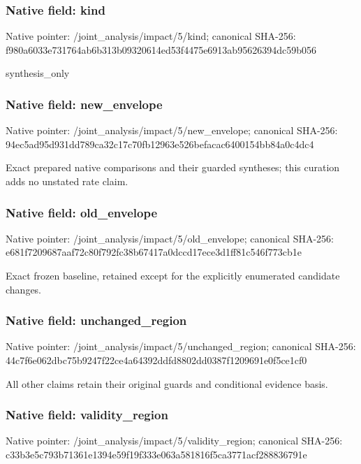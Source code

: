 \documentclass[10pt,a4paper]{article}
\begin{document}
\subsubsection{Native field: kind}
Native pointer: /joint\_\allowbreak{}analysis/impact/5/kind; canonical SHA-256: f980a6033e731764ab6b313b09320614ed53f4475e6913ab95626394dc59b056

\begingroup\raggedright\sloppy synthesis\_\allowbreak{}only\par\endgroup

\subsubsection{Native field: new\_\allowbreak{}envelope}
Native pointer: /joint\_\allowbreak{}analysis/impact/5/new\_\allowbreak{}envelope; canonical SHA-256: 94ec5ad95d931dd789ca32c17c70fb12963e526befacac6400154bb84a0c4dc4

\begingroup\raggedright\sloppy Exact prepared native comparisons and their guarded syntheses;\allowbreak{} this curation adds no unstated rate claim.\par\endgroup

\subsubsection{Native field: old\_\allowbreak{}envelope}
Native pointer: /joint\_\allowbreak{}analysis/impact/5/old\_\allowbreak{}envelope; canonical SHA-256: e681f7209687aaf72c80f792fc38b67417a0dccd17ece3d1ff81c546f773cb1e

\begingroup\raggedright\sloppy Exact frozen baseline,\allowbreak{} retained except for the explicitly enumerated candidate changes.\par\endgroup

\subsubsection{Native field: unchanged\_\allowbreak{}region}
Native pointer: /joint\_\allowbreak{}analysis/impact/5/unchanged\_\allowbreak{}region; canonical SHA-256: 44c7f6e062dbc75b9247f22ce4a64392ddfd8802dd0387f1209691e0f5ce1cf0

\begingroup\raggedright\sloppy All other claims retain their original guards and conditional evidence basis.\par\endgroup

\subsubsection{Native field: validity\_\allowbreak{}region}
Native pointer: /joint\_\allowbreak{}analysis/impact/5/validity\_\allowbreak{}region; canonical SHA-256: c33b3e5c793b71361e1394e59f19f333e063a581816f5ca3771acf288836791e
\end{document}
